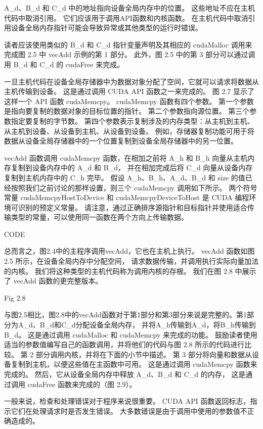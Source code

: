 A\_d、B\_d 和 C\_d 中的地址指向设备全局内存中的位置。 这些地址不应在主机代码中取消引用。 
它们应该用于调用API函数和内核函数。 在主机代码中取消引用设备全局内存指针可能会导致异常或其他类型的运行时错误。

读者应该使用类似的 B\_d 和 C\_d 指针变量声明及其相应的 cudaMalloc 调用来完成图 2.5 中 vecAdd 示例的第 1 部分。 
此外，图 2.5 中的第 3 部分可以通过调用 B\_d 和 C\_d 的 cudaFree 来完成。

一旦主机代码在设备全局存储器中为数据对象分配了空间，它就可以请求将数据从主机传输到设备。 
这是通过调用 CUDA API 函数之一来完成的。 图 2.7 显示了这样一个 API 函数 cudaMemcpy。 
cudaMemcpy 函数有四个参数。 第一个参数是指向要复制的数据对象的目标位置的指针。 第二个参数指向源位置。 
第三个参数指定要复制的字节数。 第四个参数表示复制涉及的内存类型：从主机到主机、从主机到设备、从设备到主机、从设备到设备。 
例如，存储器复制功能可用于将数据从设备全局存储器中的一个位置复制到设备全局存储器中的另一位置。

vecAdd 函数调用 cudaMemcpy 函数，在相加之前将 A\_h 和 B\_h 向量从主机内存复制到设备内存中的 A\_d 和 B\_d，
并在相加完成后将 C\_d 向量从设备内存复制到主机内存中的 C\_h 完毕。 
假设 A\_h、B\_h、A\_d、B\_d 和 size 的值已经按照我们之前讨论的那样设置，则三个 cudaMemcpy 调用如下所示。 
两个符号常量 cudaMemcpyHostToDevice 和 cudaMemcpyDeviceToHost 是 CUDA 编程环境可识别的预定义常量。 
请注意，通过正确排序源指针和目标指针并使用适合传输类型的常量，可以使用同一函数在两个方向上传输数据。

{\color{red} CODE}

总而言之，图2.4中的主程序调用vecAdd，它也在主机上执行。 vecAdd 函数如图 2.5 所示，在设备全局内存中分配空间，
请求数据传输，并调用执行实际向量加法的内核。 我们将这种类型的主机代码称为调用内核的存根。 
我们在图 2.8 中展示了 vecAdd 函数的更完整版本。

{\color{red} Fig 2.8}

与图2.5相比，图2.8中的vecAdd函数对于第1部分和第3部分来说是完整的。第1部分为A\_d、B\_d和C\_d分配设备全局内存，
并将A\_h传输到A\_d，将B\_h传输到B\_d。 这是通过调用 cudaMalloc 和 cudaMemcpy 来完成的功能。 
鼓励读者使用适当的参数值编写自己的函数调用，并将他们的代码与图 2.8 所示的代码进行比较。 
第 2 部分调用内核，并将在下面的小节中描述。 第 3 部分将向量和数据从设备复制到主机，以便这些值在主函数中可用。 
这是通过调用 cudaMemcpy 函数来完成的。 然后，它从设备全局内存中释放 A\_d、B\_d 和 C\_d 的内存，
这是通过调用 cudaFree 函数来完成的（图 2.9）。

\begin{remark}
	一般来说，检查和处理错误对于程序来说很重要。 CUDA API 函数返回标志，指示它们在处理请求时是否发生错误。 
	大多数错误是由于调用中使用的参数值不正确造成的。
\end{remark}

